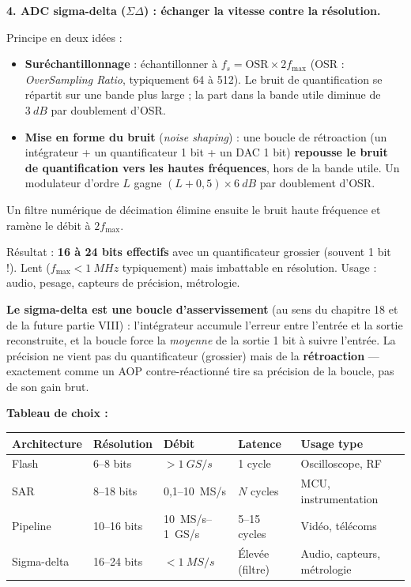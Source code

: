 \documentclass[12pt,a4paper,twoside]{book}
\begin{document}
\begin{formule}
\textbf{4. ADC sigma-delta ($\Sigma\Delta$) : échanger la vitesse contre la résolution.}

Principe en deux idées :
\begin{itemize}[nosep]
\item \textbf{Suréchantillonnage} : échantillonner à $f_s = \text{OSR} \times 2f_{\max}$ (OSR : \textit{OverSampling Ratio}, typiquement 64 à 512). Le bruit de quantification se répartit sur une bande plus large ; la part dans la bande utile diminue de $\SI{3}{dB}$ par doublement d'OSR.
\item \textbf{Mise en forme du bruit} (\textit{noise shaping}) : une boucle de rétroaction (un intégrateur + un quantificateur 1 bit + un DAC 1 bit) \textbf{repousse le bruit de quantification vers les hautes fréquences}, hors de la bande utile. Un modulateur d'ordre $L$ gagne $(L + 0{,}5) \times \SI{6}{dB}$ par doublement d'OSR.
\end{itemize}
Un filtre numérique de décimation élimine ensuite le bruit haute fréquence et ramène le débit à $2f_{\max}$.

Résultat : \textbf{16 à 24 bits effectifs} avec un quantificateur grossier (souvent 1 bit !). Lent ($f_{\max} < \SI{1}{MHz}$ typiquement) mais imbattable en résolution. Usage : audio, pesage, capteurs de précision, métrologie.
\end{formule}

\begin{intuition}
\textbf{Le sigma-delta est une boucle d'asservissement} (au sens du chapitre 18 et de la future partie VIII) : l'intégrateur accumule l'erreur entre l'entrée et la sortie reconstruite, et la boucle force la \textit{moyenne} de la sortie 1 bit à suivre l'entrée. La précision ne vient pas du quantificateur (grossier) mais de la \textbf{rétroaction} --- exactement comme un AOP contre-réactionné tire sa précision de la boucle, pas de son gain brut.
\end{intuition}

\begin{pratique}
\textbf{Tableau de choix :}
\begin{center}
\renewcommand{\arraystretch}{1.4}
\begin{tabular}{p{2.5cm}p{2.0cm}p{2.5cm}p{1.9cm}p{2.8cm}}
\toprule
\textbf{Architecture} & \textbf{Résolution} & \textbf{Débit} & \textbf{Latence} & \textbf{Usage type} \\
\midrule
Flash & 6--8 bits & $> \SI{1}{GS/s}$ & 1 cycle & Oscilloscope, RF \\
SAR & 8--18 bits & 0,1--\SI{10}{MS/s} & $N$ cycles & MCU, instrumentation \\
Pipeline & 10--16 bits & \SI{10}{MS/s}--\SI{1}{GS/s} & 5--15 cycles & Vidéo, télécoms \\
Sigma-delta & 16--24 bits & $< \SI{1}{MS/s}$ & Élevée (filtre) & Audio, capteurs, métrologie \\
\bottomrule
\end{tabular}
\end{center}
\end{pratique}
\end{document}
